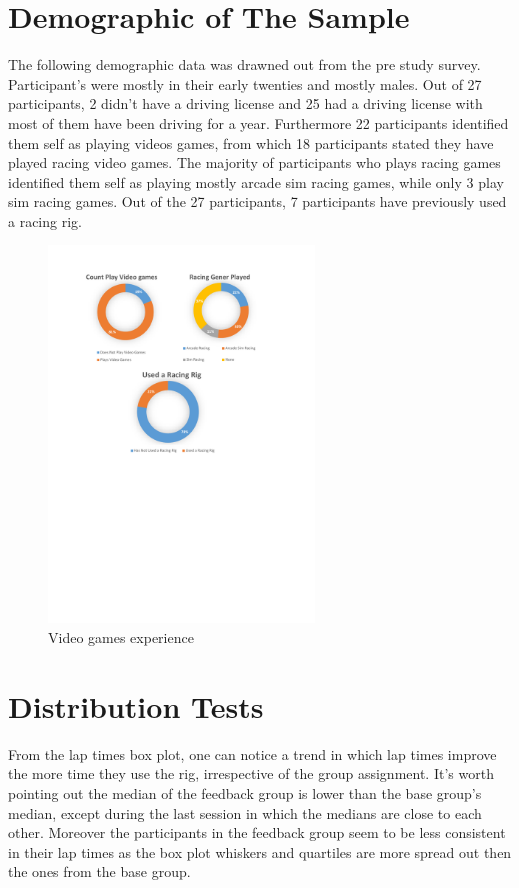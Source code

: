 \section{Demographic of The Sample}
\label{sec:eval-demographic}

The following demographic data was drawned out from the pre study survey. Participant's were mostly in their early twenties and mostly males. Out of 27 participants, 2 didn't have a driving license and 25 had a driving license with most of them have been driving for a year. Furthermore 22 participants identified them self as playing videos games, from which 18 participants stated they have played racing video games. The majority of participants who plays racing games identified them self as playing mostly arcade sim racing games, while only 3 play sim racing games. Out of the 27 participants, 7 participants have previously used a racing rig.


\begin{figure}[!htb]
	\centering
	\includegraphics[height=10cm]{charts/gamesxp.pdf}
	\caption[Gaming xp]{Video games experience}
	\label{fig:chart-gamesxp}
\end{figure}

\section{Distribution Tests}
\label{sec:eval-distTests}

From the lap times box plot, one can notice a trend in which lap times improve the more time they use the rig, irrespective of the group assignment. It's worth pointing out the median of the feedback group is lower than the base group's median, except during the last session in which the medians are close to each other. Moreover the participants in the feedback group seem to be less consistent in their lap times as the box plot whiskers and quartiles are more spread out then the ones from the base group.

